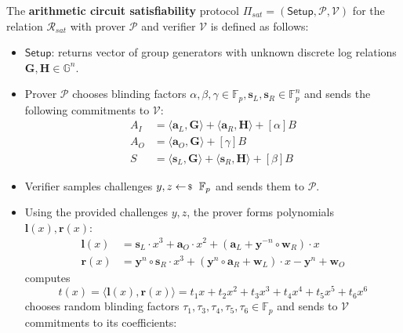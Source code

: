 \documentclass[../lecture-notes-148x210.tex]{subfiles}
\begin{document}
\begin{definition}
    The \textbf{arithmetic circuit satisfiability} protocol $\Pi_{sat} = (\mathsf{Setup}, \mathcal{P}, \mathcal{V})$ for the relation $\mathcal{R}_{sat}$ with prover $\mathcal{P}$ and verifier $\mathcal{V}$ is defined as follows:
    \begin{itemize}
        \item $\mathsf{Setup}$: returns vector of group generators with unknown discrete log relations $\mathbf{G,H} \in \mathbb{G}^n$.
        \item Prover $\mathcal{P}$ chooses blinding factors $\alpha, \beta, \gamma \in \mathbb{F}_p, \mathbf{s}_L, \mathbf{s}_R \in \mathbb{F}_p^n$ and sends the following commitments to $\mathcal{V}$:
        \begin{equation*}
            \begin{aligned}
                A_I &= \langle \mathbf{a}_L, \mathbf{G} \rangle + \langle \mathbf{a}_R, \mathbf{H} \rangle + [\alpha]B\\
                A_O &= \langle \mathbf{a}_O, \mathbf{G} \rangle + [\gamma]B\\
                S &= \langle \mathbf{s}_L, \mathbf{G} \rangle + \langle \mathbf{s}_R, \mathbf{H} \rangle + [\beta]B
            \end{aligned}
        \end{equation*}
        \item Verifier samples challenges $y,z \leftarrowS \mathbb{F}_p$ and sends them to $\mathcal{P}$.
        \item Using the provided challenges $y,z$, the prover forms polynomials $\mathbf{l}(x), \mathbf{r}(x)$:
        \begin{equation*}
            \begin{aligned}
                \mathbf{l}(x) &= \mathbf{s}_L \cdot x^3 + \mathbf{a}_O \cdot x^2 + (\mathbf{a}_L + \mathbf{y}^{-n} \circ \mathbf{w}_R) \cdot x \\
                \mathbf{r}(x) &= \mathbf{y}^n \circ \mathbf{s}_R \cdot x^3 + (\mathbf{y}^n \circ \mathbf{a}_R +  \mathbf{w}_L) \cdot x - \mathbf{y}^n + \mathbf{w}_O
            \end{aligned}
        \end{equation*}
        computes $$t(x) = \langle \mathbf{l}(x), \mathbf{r}(x) \rangle = t_1 x + t_2 x^2 + t_3 x^3 + t_4 x^4 + t_5 x^5 + t_6 x^6$$
        chooses random blinding factors $\tau_1, \tau_3, \tau_4, \tau_5, \tau_6 \in \mathbb{F}_p$ and sends to $\mathcal{V}$ commitments to its coefficients:

\end{itemize}
\end{definition}
\end{document}
